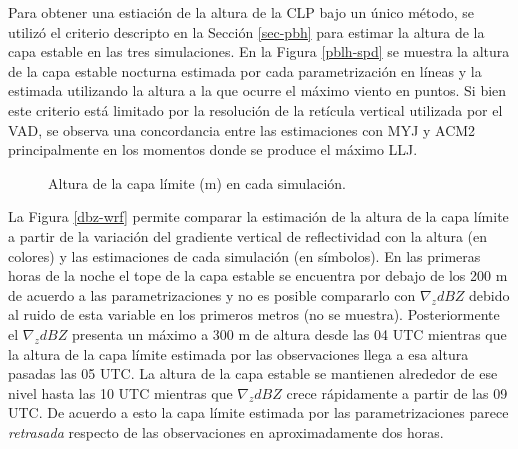 \documentclass[12pt,spanish,oneside, a4paper]{book}
\begin{document}
Para obtener una estiación de la altura de la CLP bajo un único método,
se utilizó el criterio descripto en la Sección \ref{sec-pbh} para
estimar la altura de la capa estable en las tres simulaciones. En la
Figura \ref{pblh-spd} se muestra la altura de la capa estable nocturna
estimada por cada parametrización en líneas y la estimada utilizando la
altura a la que ocurre el máximo viento en puntos. Si bien este criterio
está limitado por la resolución de la retícula vertical utilizada por el
VAD, se observa una concordancia entre las estimaciones con MYJ y ACM2
principalmente en los momentos donde se produce el máximo LLJ.

\begin{figure}

{\centering {}\newline{}

}

\caption{Altura de la capa límite (m) en cada simulación. \label{pblh-wrf}}\label{fig:pblh-wrf}
\end{figure}

La Figura \ref{dbz-wrf} permite comparar la estimación de la altura de
la capa límite a partir de la variación del gradiente vertical de
reflectividad con la altura (en colores) y las estimaciones de cada
simulación (en símbolos). En las primeras horas de la noche el tope de
la capa estable se encuentra por debajo de los 200 m de acuerdo a las
parametrizaciones y no es posible compararlo con \(\nabla_{z}dBZ\)
debido al ruido de esta variable en los primeros metros (no se muestra).
Posteriormente el \(\nabla_{z}dBZ\) presenta un máximo a 300 m de altura
desde las 04 UTC mientras que la altura de la capa límite estimada por
las observaciones llega a esa altura pasadas las 05 UTC. La altura de la
capa estable se mantienen alrededor de ese nivel hasta las 10 UTC
mientras que \(\nabla_{z}dBZ\) crece rápidamente a partir de las 09 UTC.
De acuerdo a esto la capa límite estimada por las parametrizaciones
parece \emph{retrasada} respecto de las observaciones en aproximadamente
dos horas.
\end{document}
